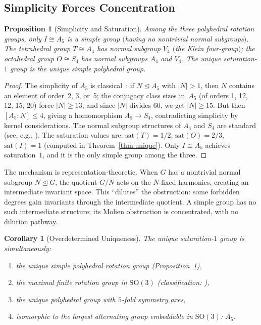 \documentclass[11pt,letterpaper]{article}
\newtheorem{proposition}[theorem]{Proposition}
\newtheorem{corollary}[theorem]{Corollary}
\theoremstyle{definition}
\newcommand{\abs}[1]{\lvert #1 \rvert}
\begin{document}
\subsection{Simplicity Forces Concentration}
\begin{proposition}[Simplicity and Saturation]\label{prop:simple}
Among the three polyhedral rotation groups, only $I\cong A_5$ is a simple group $($having no nontrivial normal subgroups$)$.  The tetrahedral group $T\cong A_4$ has normal subgroup $V_4$ $($the Klein four-group$)$; the octahedral group $O\cong S_4$ has normal subgroups $A_4$ and $V_4$.  The unique saturation-$1$ group is the unique simple polyhedral group.
\end{proposition}
\begin{proof}
The simplicity of $A_5$ is classical~\cite{Rotman1995}: if $N\trianglelefteq A_5$ with $\abs{N}>1$, then $N$ contains an element of order~2, 3, or~5; the conjugacy class sizes in~$A_5$ (of orders 1, 12, 12, 15, 20) force $\abs{N}\ge13$, and since $\abs{N}$ divides $60$, we get $\abs{N}\ge15$.  But then $[A_5:N]\le4$, giving a homomorphism $A_5\to S_4$, contradicting simplicity by kernel considerations.  The normal subgroup structures of $A_4$ and $S_4$ are standard (see, e.g., \cite{Rotman1995}).
The saturation values are: $\mathrm{sat}(T)=1/2$, $\mathrm{sat}(O)=2/3$, $\mathrm{sat}(I)=1$ (computed in Theorem~\ref{thm:unique}).  Only $I\cong A_5$ achieves saturation~$1$, and it is the only simple group among the three.
\end{proof}
The mechanism is representation-theoretic.  When $G$ has a nontrivial normal subgroup $N\trianglelefteq G$, the quotient $G/N$ acts on the $N$-fixed harmonics, creating an intermediate invariant space.  This ``dilutes'' the obstruction: some forbidden degrees gain invariants through the intermediate quotient.  A simple group has no such intermediate structure; its Molien obstruction is concentrated, with no dilution pathway.
\begin{corollary}[Overdetermined Uniqueness]\label{cor:overdet}
The unique saturation-$1$ group is simultaneously:
\begin{enumerate}[label=\textup{(\alph*)}]
  \item the unique simple polyhedral rotation group \textup{(Proposition~\ref{prop:simple})},
  \item the maximal finite rotation group in $\mathrm{SO}(3)$ \textup{(classification: \cite{Klein1884})},
  \item the unique polyhedral group with $5$-fold symmetry axes,
  \item isomorphic to the largest alternating group embeddable in $\mathrm{SO}(3)$: $A_5$.
\end{enumerate}
\end{corollary}
\end{document}
